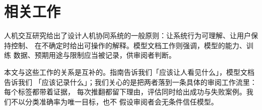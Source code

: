 \section{相关工作}
\label{sec:related}

人机交互研究给出了设计人机协同系统的一般原则：让系统行为可理解、让用户保持控制、
在不确定时给出可操作的解释\cite{amershi2019}。模型文档工作则强调，模型的能力、训练
数据、预期用途与限制应当被记录，供审阅者判断\cite{mitchell2019,gebru2021}。

本文与这些工作的关系是互补的。指南告诉我们「应该让人看见什么」，模型文档告诉我们
「应该记录什么」；我们关心的是把两者落到一条具体的审阅工作流里：每个标签都带着证据，
每次推翻都留下理由，评估同时给出成功与失败案例。我们不以分类准确率为唯一目标，也不
假设审阅者会无条件信任模型。
